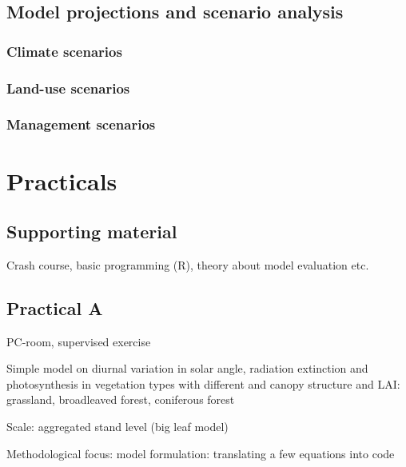 \documentclass[]{book}
\begin{document}
\chapter{Model projections and scenario
analysis}\label{model-projections-and-scenario-analysis}


\section{Climate scenarios}\label{climate-scenarios}

\section{Land-use scenarios}\label{land-use-scenarios}

\section{Management scenarios}\label{management-scenarios}

\part{Practicals}\label{part-practicals}

\chapter*{Supporting material}\label{supporting-material}

Crash course, basic programming (R), theory about model evaluation etc.

\chapter*{Practical A}\label{practical-a}

PC-room, supervised exercise

Simple model on diurnal variation in solar angle, radiation extinction
and photosynthesis in vegetation types with different and canopy
structure and LAI: grassland, broadleaved forest, coniferous forest

Scale: aggregated stand level (big leaf model)

Methodological focus: model formulation: translating a few equations
into code
\end{document}
